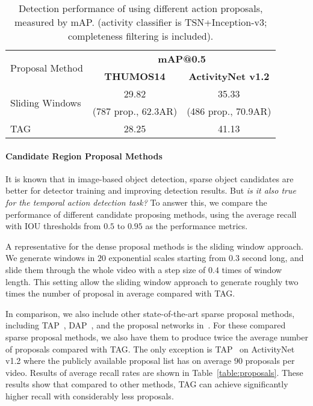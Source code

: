 \documentclass[10pt,twocolumn,letterpaper]{article}
\begin{document}
\begin{table}[h]
	\small
	\begin{center}
		\begin{tabular}{l|c|c} 
			\hline
			\multirow{2}{*}{Proposal Method} & \multicolumn{2}{c}{\textbf{mAP@0.5}} \\ \cline{2-3} 
			& \textbf{THUMOS14}         & \textbf{ActivityNet v1.2} \\ \hline
			\multirow{2}{*}{Sliding Windows}  &   29.82  &   35.33      \\
			& (787 prop., 62.3AR) & (486 prop., 70.9AR)
			\\ \hline
\hline
			TAG                                     &   28.25   &   41.13         \\ \hline
		\end{tabular}
	\end{center}
	
	\caption{Detection performance of using different action proposals, measured by mAP. (activity classifier is TSN+Inception-v3; completeness filtering is included).}
	\label{table:proposal_det}
\end{table}

\paragraph{Candidate Region Proposal Methods}
It is known that in image-based object detection, sparse object candidates are better for detector training and improving detection results. 
But {\em is it also true for the temporal action detection task?}
To answer this, we compare the performance of different candidate proposing methods,
using the average recall with IOU thresholds from $ 0.5 $ to $ 0.95 $ as the performance metrics.


A representative for the dense proposal methods is the sliding window approach. 
We generate windows in $ 20 $ exponential scales starting from $ 0.3 $ second long, and slide them through the whole video with a step size of $ 0.4 $ times of window length.
This setting allow the sliding window approach to generate roughly two times the number of proposal in average compared with TAG.


In comparison, we also include other state-of-the-art sparse proposal methods, including TAP~\cite{caba2016cvpr}, DAP~\cite{Escorcia2016DAP}, and the proposal networks in~\cite{Shou2016SCNN}.
For these compared sparse proposal methods, we also have them to produce twice the average number of proposals compared with TAG.
The only exception is TAP~\cite{caba2016cvpr} on ActivityNet v1.2 where the publicly available proposal list has on average $ 90 $ proposals per video.
Results of average recall rates are shown in Table~\ref{table:proposals}. 
These results show that
compared to other methods, TAG can achieve significantly higher recall with considerably less proposals.
\end{document}

